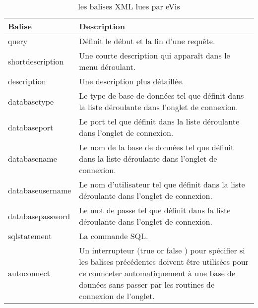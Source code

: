 \begin{table}[ht]
\centering
 \begin{tabular}{|p{3cm}|p{11cm}|}
 \hline \textbf{Balise} & \textbf{Description}\\
 \hline query & Définit le début et la fin d'une requête.\\
 \hline shortdescription & Une courte description qui apparaît dans le menu déroulant.\\
 \hline description & Une description plus détaillée.\\
 \hline databasetype & Le type de base de données tel que définit dans la liste déroulante dans l'onglet de connexion.\\
 \hline databaseport & Le port tel que définit dans la liste déroulante dans l'onglet de connexion.\\
 \hline databasename & Le nom de la base de données tel que définit dans la liste déroulante dans l'onglet de connexion.\\
 \hline databaseusername & Le nom d'utilisateur tel que définit dans la liste déroulante dans l'onglet de connexion.\\
 \hline databasepassword & Le mot de passe tel que définit dans la liste déroulante dans l'onglet de connexion.\\
 \hline sqlstatement & La commande SQL.\\
 \hline autoconnect & Un interrupteur (true  or false )  pour spécifier si les balises précédentes doivent être utilisées pour ce connceter automatiquement à une base de données sans passer par les routines de connexion de l'onglet.\\
 \hline
\end{tabular}
\caption{les balises XML lues par eVis}\label{tab:evis_xml_tags}
\end{table}

